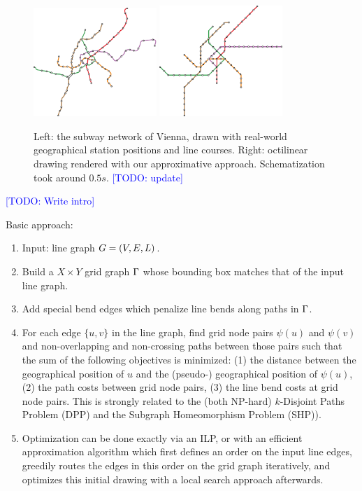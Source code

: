 \documentclass[sigconf]{acmart}
\newcommand\TODO[1]{\textcolor{blue}{\small [TODO: #1]}}
\begin{document}
\begin{figure}[t]
  \centering
	\includegraphics[width=0.414\textwidth]{figures/octi_input.pdf}
	\hspace{1cm}
	\includegraphics[width=0.414\textwidth]{figures/octi.pdf}
	\caption{Left: the subway network of Vienna, drawn with real-world geographical station positions and line courses. Right: octilinear drawing rendered with our approximative approach. Schematization took around $0.5 s$. \TODO{update}}
	\label{FIG:examplewien}
\end{figure}

\TODO{Write intro}

Basic approach:

\begin{enumerate}
	\item Input: line graph $G = (V, E, L)$.
	\item Build a $X\times Y$ grid graph $\Gamma$ whose bounding box matches that of the input line graph.
	\item Add special bend edges which penalize line bends along paths in $\Gamma$.
	\item For each edge $\{u, v\}$ in the line graph, find grid node pairs $\psi(u)$ and $\psi(v)$ and non-overlapping and non-crossing paths between those pairs such that the sum of the following objectives is minimized: (1) the distance between the geographical position of $u$ and the (pseudo-) geographical position of $\psi(u)$, (2) the path costs between grid node pairs, (3) the line bend costs at grid node pairs. This is strongly related to the (both NP-hard) $k$-Disjoint Paths Problem (DPP) and the Subgraph Homeomorphism Problem (SHP)).
	\item Optimization can be done exactly via an ILP, or with an efficient approximation algorithm which first defines an order on the input line edges, greedily routes the edges in this order on the grid graph iteratively, and optimizes this initial drawing with a local search approach afterwards.
\end{enumerate}
\end{document}
